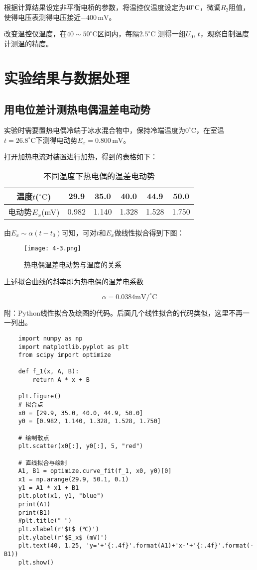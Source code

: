 \documentclass[12pt]{article}
\begin{document}
根据计算结果设定非平衡电桥的参数，将温控仪温度设定为$40^\circ\mathrm{C}$，微调$ R_2 $阻值，使得电压表测得电压接近$ -400\,\mathrm{mV} $。

改变温控仪温度，在$ 40\sim 50^\circ\mathrm{C}$区间内，每隔$2.5^\circ\mathrm{C}$ 测得一组$ U_0,\,t $，观察自制温度计测温的精度。

\section{实验结果与数据处理}
\subsection{用电位差计测热电偶温差电动势}
实验时需要置热电偶冷端于冰水混合物中，保持冷端温度为$ 0^\circ\mathrm{C} $，在室温$ t=26.8^\circ\mathrm{C} $下测得电动势$ E_x=0.800\,\mathrm{mV} $。

打开加热电流对装置进行加热，得到的表格如下：

\begin{table}[htbp]
    \centering
    \begin{tabular}{|c|c|c|c|c|c|}
    \hline
    温度$t$($^\circ\mathrm{C}$) & 29.9  & 35.0  & 40.0  & 44.9  & 50.0  \\
    \hline
    电动势$E_x$(mV) & 0.982  & 1.140  & 1.328  & 1.528  & 1.750  \\
    \hline
    \end{tabular}
    \caption{不同温度下热电偶的温差电动势}
\end{table}

由$E_x \sim \alpha (t-t_0)$可知，可对$t$和$E_x$做线性拟合得到下图：

\begin{figure}[htbp]
    \centering
    \texttt{[image: 4-3.png]}
    \caption{热电偶温差电动势与温度的关系}
\end{figure}

上述拟合曲线的斜率即为热电偶的温差电系数

\[
    \alpha = 0.0384\mathrm{mV/^\circ C}
\]

附：Python线性拟合及绘图的代码。后面几个线性拟合的代码类似，这里不再一一列出。

\begin{lstlisting}
    import numpy as np
    import matplotlib.pyplot as plt
    from scipy import optimize
    
    def f_1(x, A, B):
        return A * x + B
    
    plt.figure()
    # 拟合点
    x0 = [29.9, 35.0, 40.0, 44.9, 50.0]
    y0 = [0.982, 1.140, 1.328, 1.528, 1.750]
    
    # 绘制散点
    plt.scatter(x0[:], y0[:], 5, "red")
    
    # 直线拟合与绘制
    A1, B1 = optimize.curve_fit(f_1, x0, y0)[0]
    x1 = np.arange(29.9, 50.1, 0.1)
    y1 = A1 * x1 + B1
    plt.plot(x1, y1, "blue")
    print(A1)
    print(B1)
    #plt.title(" ")
    plt.xlabel(r'$t$ (℃)')
    plt.ylabel(r'$E_x$ (mV)')
    plt.text(40, 1.25, 'y='+'{:.4f}'.format(A1)+'x-'+'{:.4f}'.format(-B1))
    plt.show()
\end{lstlisting}
\end{document}
